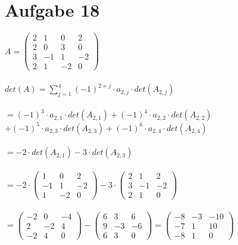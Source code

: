 \documentclass[12pt,a4paper]{article}
\begin{document}
\section*{Aufgabe 18}
$A=\begin{pmatrix} 2&1&0&2\\2&0&3&0\\3&{-1}&1&{-2}\\2&1&{-2}&0 \end{pmatrix}$\\
\\
$det(A)=\sum \limits_{j=1}^{4}(-1)^{2+j}\cdot a_{2,j}\cdot det(A_{2,j}) $\\
\\
$=(-1)^3\cdot a_{2,1}\cdot det(A_{2,1})+(-1)^4\cdot a_{2,2}\cdot det(A_{2,2})$\\
$+(-1)^5\cdot a_{2,3}\cdot det(A_{2,3})+(-1)^6\cdot a_{2,4}\cdot det(A_{2,4})$\\
\\
$=-2\cdot det(A_{2,1})-3\cdot det(A_{2,3})$\\
\\
$=-2\cdot \begin{pmatrix} 1&0&2\\{-1}&1&{-2}\\1&{-2}&0 \end{pmatrix}-3\cdot \begin{pmatrix} 2&1&2\\3&{-1}&{-2}\\2&1&0 \end{pmatrix}$\\
\\
$=\begin{pmatrix} -2&0&-4\\2&-2&4\\-2&4&0 \end{pmatrix} - \begin{pmatrix} 6&3&6\\9&-3&-6\\6&3&0 \end{pmatrix}=\begin{pmatrix}-8&-3&-10\\-7&1&10\\-8&1&0 \end{pmatrix}$\\
\\
\end{document}
